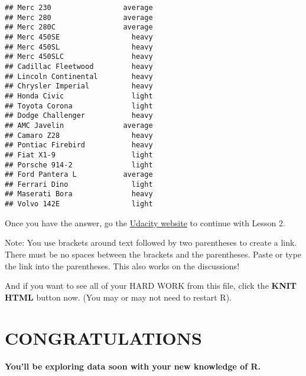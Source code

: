 \documentclass[]{article}
\let\oldparagraph\paragraph
\renewcommand{\paragraph}[1]{\oldparagraph{#1}\mbox{}}
\begin{document}
\begin{verbatim}
## Merc 230                 average
## Merc 280                 average
## Merc 280C                average
## Merc 450SE                 heavy
## Merc 450SL                 heavy
## Merc 450SLC                heavy
## Cadillac Fleetwood         heavy
## Lincoln Continental        heavy
## Chrysler Imperial          heavy
## Honda Civic                light
## Toyota Corona              light
## Dodge Challenger           heavy
## AMC Javelin              average
## Camaro Z28                 heavy
## Pontiac Firebird           heavy
## Fiat X1-9                  light
## Porsche 914-2              light
## Ford Pantera L           average
## Ferrari Dino               light
## Maserati Bora              heavy
## Volvo 142E                 light
\end{verbatim}

Once you have the answer, go the
\href{https://www.udacity.com/course/viewer\#!/c-ud651/l-729069797/e-804129319/m-811719066}{Udacity
website} to continue with Lesson 2.

Note: You use brackets around text followed by two parentheses to create
a link. There must be no spaces between the brackets and the
parentheses. Paste or type the link into the parentheses. This also
works on the discussions!

And if you want to see all of your HARD WORK from this file, click the
\textbf{KNIT HTML} button now. (You may or may not need to restart R).

\section{CONGRATULATIONS}\label{congratulations}

\paragraph{You'll be exploring data soon with your new knowledge of
R.}\label{youll-be-exploring-data-soon-with-your-new-knowledge-of-r.}
\end{document}

